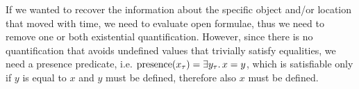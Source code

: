 If we wanted to recover the information about the specific object and/or location that moved with time, we need to evaluate open
formulae, thus we need to remove one or both existential quantification. However, since there is no quantification that
avoids undefined values that trivially satisfy equalities, we need a presence predicate, i.e. $\text{presence}(x_\tau) =
\exists {y_\tau} \ldotp {x = y}$, which is satisfiable only if $y$ is equal to $x$ and $y$ must be defined, therefore
also $x$ must be defined.
